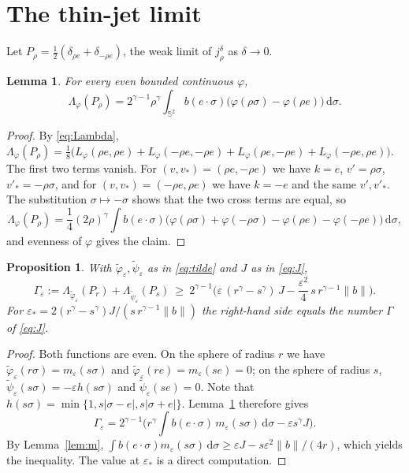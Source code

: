 \documentclass[11pt]{amsart}
\newtheorem{proposition}[theorem]{Proposition}
\newtheorem{lemma}[theorem]{Lemma}
\theoremstyle{definition}
\newcommand{\Sph}{\mathbb{S}}
\newcommand{\dd}{\,\mathrm{d}}
\newcommand{\nb}{\|b\|}
\begin{document}
\section{The thin-jet limit}\label{sec:dirac}

Let $P_\rho=\frac12(\delta_{\rho e}+\delta_{-\rho e})$, the weak limit of $j^\delta_\rho$ as $\delta\to0$.

\begin{lemma}\label{lem:dirac}
For every even bounded continuous $\varphi$,
\[
\Lambda_\varphi(P_\rho)=2^{\gamma-1}\rho^\gamma\int_{\Sph^2}b(e\cdot\sigma)\big(\varphi(\rho\sigma)-\varphi(\rho e)\big)\dd\sigma .
\]
\end{lemma}

\begin{proof}
By \eqref{eq:Lambda}, $\Lambda_\varphi(P_\rho)=\frac18\big(L_\varphi(\rho e,\rho e)+L_\varphi(-\rho e,-\rho e)+L_\varphi(\rho e,-\rho e)+L_\varphi(-\rho e,\rho e)\big)$. The first two terms vanish. For $(v,v_*)=(\rho e,-\rho e)$ we have $k=e$, $v'=\rho\sigma$, $v'_*=-\rho\sigma$, and for $(v,v_*)=(-\rho e,\rho e)$ we have $k=-e$ and the same $v',v'_*$. The substitution $\sigma\mapsto-\sigma$ shows that the two cross terms are equal, so
\[
\Lambda_\varphi(P_\rho)=\frac14(2\rho)^\gamma\int b(e\cdot\sigma)\big(\varphi(\rho\sigma)+\varphi(-\rho\sigma)-\varphi(\rho e)-\varphi(-\rho e)\big)\dd\sigma,
\]
and evenness of $\varphi$ gives the claim.
\end{proof}

\begin{proposition}\label{prop:gain}
With $\tilde\varphi_\varepsilon,\tilde\psi_\varepsilon$ as in \eqref{eq:tilde} and $J$ as in \eqref{eq:J},
\[
\Gamma_\varepsilon:=\Lambda_{\tilde\varphi_\varepsilon}(P_r)+\Lambda_{\tilde\psi_\varepsilon}(P_s)\ \ge\ 2^{\gamma-1}\Big(\varepsilon\,(r^\gamma-s^\gamma)\,J-\frac{\varepsilon^2}{4}\,s\,r^{\gamma-1}\nb\Big).
\]
For $\varepsilon_*=2(r^\gamma-s^\gamma)J/(s\,r^{\gamma-1}\nb)$ the right-hand side equals the number $\Gamma$ of \eqref{eq:J}.
\end{proposition}

\begin{proof}
Both functions are even. On the sphere of radius $r$ we have $\tilde\varphi_\varepsilon(r\sigma)=m_\varepsilon(s\sigma)$ and $\tilde\varphi_\varepsilon(re)=m_\varepsilon(se)=0$; on the sphere of radius $s$, $\tilde\psi_\varepsilon(s\sigma)=-\varepsilon h(s\sigma)$ and $\tilde\psi_\varepsilon(se)=0$. Note that $h(s\sigma)=\min\{1,s|\sigma-e|,s|\sigma+e|\}$. Lemma~\ref{lem:dirac} therefore gives
\[
\Gamma_\varepsilon=2^{\gamma-1}\Big(r^\gamma\int b(e\cdot\sigma)\,m_\varepsilon(s\sigma)\dd\sigma-\varepsilon s^\gamma J\Big).
\]
By Lemma~\ref{lem:m}, $\int b(e\cdot\sigma)m_\varepsilon(s\sigma)\dd\sigma\ge\varepsilon J-s\varepsilon^2\nb/(4r)$, which yields the inequality. The value at $\varepsilon_*$ is a direct computation.
\end{proof}
\end{document}
